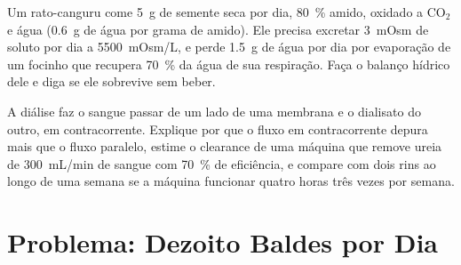 \begin{exercise}[$\star\star\star$]\label{exo:b3:renal-osmoregulation:11}
Um rato-canguru come \qty{5}{g} de semente seca por dia, \qty{80}{\%}
amido, oxidado a CO$_{2}$ e água (\qty{0.6}{g} de água por grama de
amido). Ele precisa excretar \qty{3}{mOsm} de soluto por dia a
\qty{5500}{mOsm/L}, e perde \qty{1.5}{g} de água por dia por evaporação
de um focinho que recupera \qty{70}{\%} da água de sua respiração.
Faça o balanço hídrico dele e diga se ele sobrevive sem beber.
\end{exercise}

\begin{exercise}[$\star\star\star$]\label{exo:b3:renal-osmoregulation:12}
A diálise faz o sangue passar de um lado de uma membrana e o dialisato
do outro, em contracorrente. Explique por que o fluxo em contracorrente
depura mais que o fluxo paralelo, estime o clearance de uma máquina que
remove ureia de \qty{300}{mL/min} de sangue com \qty{70}{\%} de
eficiência, e compare com dois rins ao longo de uma semana se a máquina
funcionar quatro horas três vezes por semana.
\end{exercise}

\section{Problema: Dezoito Baldes por Dia}

